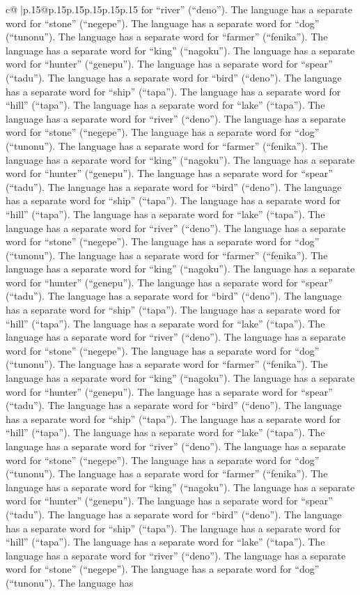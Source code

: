 \documentclass{article}
\begin{document}
{\begin{supertabular}{c@{$\;$}|p{.15\linewidth}@{}p{.15\linewidth}p{.15\linewidth}p{.15\linewidth}p{.15\linewidth}p{.15\linewidth}}
{{{for “river” (“deno”). The language has a separate word for “stone” (“negepe”). The language has a separate word for “dog” (“tunonu”). The language has a separate word for “farmer” (“fenika”). The language has a separate word for “king” (“nagoku”). The language has a separate word for “hunter” (“genepu”). The language has a separate word for “spear” (“tadu”). The language has a separate word for “bird” (“deno”). The language has a separate word for “ship” (“tapa”). The language has a separate word for “hill” (“tapa”). The language has a separate word for “lake” (“tapa”). The language has a separate word for “river” (“deno”). The language has a separate word for “stone” (“negepe”). The language has a separate word for “dog” (“tunonu”). The language has a separate word for “farmer” (“fenika”). The language has a separate word for “king” (“nagoku”). The language has a separate word for “hunter” (“genepu”). The language has a separate word for “spear” (“tadu”). The language has a separate word for “bird” (“deno”). The language has a separate word for “ship” (“tapa”). The language has a separate word for “hill” (“tapa”). The language has a separate word for “lake” (“tapa”). The language has a separate word for “river” (“deno”). The language has a separate word for “stone” (“negepe”). The language has a separate word for “dog” (“tunonu”). The language has a separate word for “farmer” (“fenika”). The language has a separate word for “king” (“nagoku”). The language has a separate word for “hunter” (“genepu”). The language has a separate word for “spear” (“tadu”). The language has a separate word for “bird” (“deno”). The language has a separate word for “ship” (“tapa”). The language has a separate word for “hill” (“tapa”). The language has a separate word for “lake” (“tapa”). The language has a separate word for “river” (“deno”). The language has a separate word for “stone” (“negepe”). The language has a separate word for “dog” (“tunonu”). The language has a separate word for “farmer” (“fenika”). The language has a separate word for “king” (“nagoku”). The language has a separate word for “hunter” (“genepu”). The language has a separate word for “spear” (“tadu”). The language has a separate word for “bird” (“deno”). The language has a separate word for “ship” (“tapa”). The language has a separate word for “hill” (“tapa”). The language has a separate word for “lake” (“tapa”). The language has a separate word for “river” (“deno”). The language has a separate word for “stone” (“negepe”). The language has a separate word for “dog” (“tunonu”). The language has a separate word for “farmer” (“fenika”). The language has a separate word for “king” (“nagoku”). The language has a separate word for “hunter” (“genepu”). The language has a separate word for “spear” (“tadu”). The language has a separate word for “bird” (“deno”). The language has a separate word for “ship” (“tapa”). The language has a separate word for “hill” (“tapa”). The language has a separate word for “lake” (“tapa”). The language has a separate word for “river” (“deno”). The language has a separate word for “stone” (“negepe”). The language has a separate word for “dog” (“tunonu”). The language has }}}
\end{supertabular}}
\end{document}
